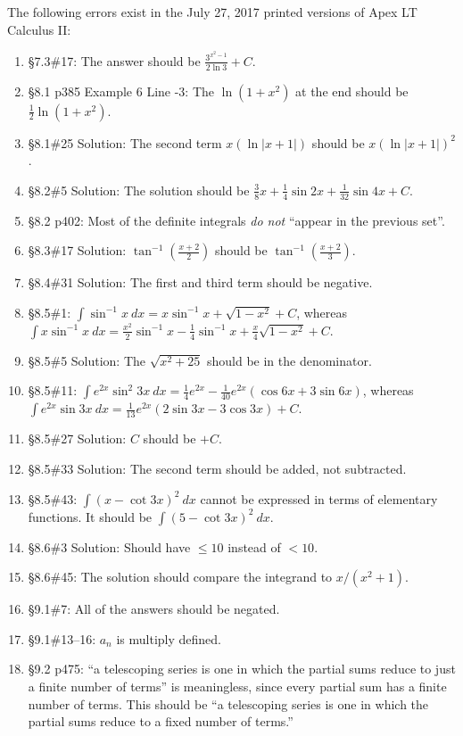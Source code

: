 \documentclass{amsart}
\newcommand{\ds}{\displaystyle}
\newcommand{\abs}[1]{\left\lvert#1\right\rvert}
\begin{document}
The following errors exist in the July 27, 2017 printed versions of Apex LT Calculus II:
\begin{enumerate}
\item \S7.3\#17: The answer should be $\frac{3^{x^2-1}}{2\ln3}+C$.
\item \S8.1 p385 Example 6 Line -3: The $\ln(1+x^2)$ at the end should be $\frac12\ln(1+x^2)$.
\item \S8.1\#25 Solution: The second term $x\left(\ln\abs{x+1}\right)$ should be $x\left(\ln\abs{x+1}\right)^2$.
\item \S8.2\#5 Solution: The solution should be $\frac38 x+\frac14\sin2x+\frac1{32}\sin4x+C$.
\item \S8.2 p402: Most of the definite integrals \emph{do not} ``appear in the previous set''. %
\item \S8.3\#17 Solution: $\tan^{-1}\left(\frac{x+2}2\right)$ should be $\tan^{-1}\left(\frac{x+2}3\right)$.
\item \S8.4\#31 Solution: The first and third term should be negative.
\item \S8.5\#1: $\int \sin^{-1}x\ dx=x\sin^{-1}x+\sqrt{1-x^2}+C$, whereas\\
$\int x\sin^{-1}x\ dx=\frac{x^2}{2} \sin^{-1}x - \frac{1}{4} \sin^{-1}x + \frac{x}{4} \sqrt{1-x^2}+C$.
\item \S8.5\#5 Solution: The $\sqrt{x^2+25}$ should be in the denominator.
\item \S8.5\#11: $\int e^{2x}\sin^2 3x\ dx=\frac14e^{2x}-\frac1{40}e^{2x}(\cos6x+3\sin6x)$, whereas $\int e^{2x}\sin 3x\ dx=\frac{1}{13} e^{2x}(2 \sin 3x - 3\cos 3x) +C$.
\item \S8.5\#27 Solution: $C$ should be $+C$.
\item \S8.5\#33 Solution: The second term should be added, not subtracted.
\item \S8.5\#43: $\ds\int(x-\cot 3x)^2\ dx$ cannot be expressed in terms of elementary functions.  It should be $\ds\int (5- \cot 3x)^2\ dx$.
\item \S8.6\#3 Solution: Should have $\le10$ instead of $<10$.
\item \S8.6\#45: The solution should compare the integrand to $x/(x^2+1)$.
\item \S9.1\#7: All of the answers should be negated.
\item \S9.1\#13--16: $a_n$ is multiply defined.
\item \S9.2 p475: ``a telescoping series is one in which the partial sums reduce to just a finite number of terms'' is meaningless, since every partial sum has a finite number of terms.  This should be ``a telescoping series is one in which the partial sums reduce to a fixed number of terms.''

\end{enumerate}
\end{document}
